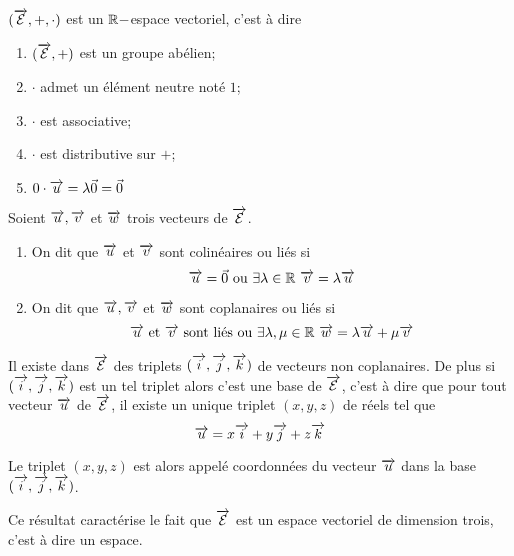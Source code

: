 \begin{prop}
  \((\overrightarrow{\mathcal{E}}, +, \cdot)\) est un \(\mathbb{R}-\)espace vectoriel, c'est à dire
  \begin{enumerate}
    \item \((\overrightarrow{\mathcal{E}}, +)\) est un groupe abélien;
    \item \(\cdot\) admet un élément neutre noté \(1\);
    \item \(\cdot\) est associative;
    \item \(\cdot\) est distributive sur \(+\);
    \item \(0 \cdot \overrightarrow{u} = \lambda \vec{0} = \vec{0}\)
  \end{enumerate}
\end{prop}
\begin{defdef}
  Soient \(\overrightarrow{u}, \overrightarrow{v}\) et \(\overrightarrow{w}\) trois vecteurs de \(\overrightarrow{\mathcal{E}}\).
  \begin{enumerate}
    \item On dit que \(\overrightarrow{u}\) et \(\overrightarrow{v}\) sont colinéaires ou liés si
      \begin{equation}
        \overrightarrow{u} = \vec{0} \textrm{~ou~} \exists \lambda \in \mathbb{R} \ \overrightarrow{v} = \lambda \overrightarrow{u}
      \end{equation}
    \item On dit que \(\overrightarrow{u}, \overrightarrow{v}\) et \(\overrightarrow{w}\) sont coplanaires ou liés si
      \begin{equation}
        \overrightarrow{u} \textrm{~et~} \overrightarrow{v} \textrm{~sont liés ou~} \exists \lambda, \mu 
        \in \mathbb{R} \ \overrightarrow{w} = \lambda \overrightarrow{u} + \mu \overrightarrow{v}
      \end{equation}
  \end{enumerate}
\end{defdef}
\begin{prop}
  Il existe dans \(\overrightarrow{\mathcal{E}}\) des triplets \((\overrightarrow{i},\overrightarrow{j},\overrightarrow{k})\) de vecteurs non 
  coplanaires. De plus si \((\overrightarrow{i},\overrightarrow{j},\overrightarrow{k})\) est un tel triplet alors c'est une 
  base de \(\overrightarrow{\mathcal{E}}\), c'est à dire que pour tout vecteur \(\overrightarrow{u}\) de 
  \(\overrightarrow{\mathcal{E}}\), il existe un unique triplet \((x,y,z)\) de réels tel que
  \begin{equation}
    \overrightarrow{u} = x\overrightarrow{i} + y\overrightarrow{j} + z\overrightarrow{k}
  \end{equation}
\end{prop}
\begin{defdef}
  Le triplet \((x,y,z)\) est alors appelé coordonnées du vecteur \(\overrightarrow{u}\) dans 
  la base \((\overrightarrow{i},\overrightarrow{j},\overrightarrow{k})\).
\end{defdef}

Ce résultat caractérise le fait que \(\overrightarrow{\mathcal{E}}\) est un espace vectoriel de 
dimension trois, c'est à dire un espace.

